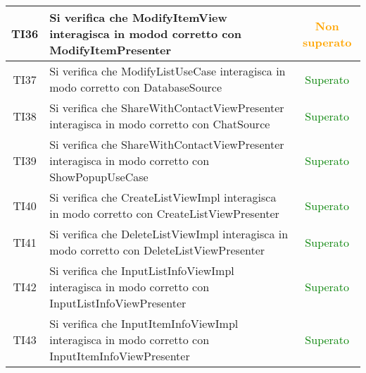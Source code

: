 \begin{center}
\begin{longtable}{|c|>{\centering}m{10cm}|c|}
		TI36 & Si verifica che ModifyItemView interagisca in modod corretto con ModifyItemPresenter & \textcolor{Orange}{Non superato}\\ \hline
		TI37 & Si verifica che ModifyListUseCase interagisca in modo corretto con DatabaseSource & \textcolor{Green}{Superato}\\ \hline
		TI38 & Si verifica che ShareWithContactViewPresenter interagisca in modo corretto con ChatSource & \textcolor{Green}{Superato}\\ \hline
		TI39 & Si verifica che ShareWithContactViewPresenter interagisca in modo corretto con ShowPopupUseCase & \textcolor{Green}{Superato}\\ \hline
		TI40 & Si verifica che CreateListViewImpl interagisca in modo corretto con CreateListViewPresenter & \textcolor{Green}{Superato}\\ \hline
		TI41 & Si verifica che DeleteListViewImpl interagisca in modo corretto con DeleteListViewPresenter & \textcolor{Green}{Superato}\\ \hline
		TI42 & Si verifica che InputListInfoViewImpl interagisca in modo corretto con InputListInfoViewPresenter & \textcolor{Green}{Superato}\\ \hline
		TI43 & Si verifica che InputItemInfoViewImpl interagisca in modo corretto con InputItemInfoViewPresenter & \textcolor{Green}{Superato}\\ \hline
	\end{longtable}
\end{center}
